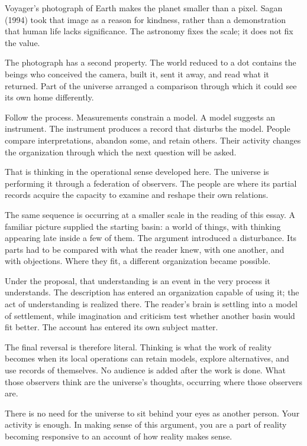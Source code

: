 \documentclass[
  11pt,
]{article}
\begin{document}
Voyager's photograph of Earth makes the planet smaller than a pixel.
Sagan (1994) took that image as a reason for kindness, rather than a
demonstration that human life lacks significance. The astronomy fixes
the scale; it does not fix the value.

The photograph has a second property. The world reduced to a dot
contains the beings who conceived the camera, built it, sent it away,
and read what it returned. Part of the universe arranged a comparison
through which it could see its own home differently.

Follow the process. Measurements constrain a model. A model suggests an
instrument. The instrument produces a record that disturbs the model.
People compare interpretations, abandon some, and retain others. Their
activity changes the organization through which the next question will
be asked.

That is thinking in the operational sense developed here. The universe
is performing it through a federation of observers. The people are where
its partial records acquire the capacity to examine and reshape their
own relations.

The same sequence is occurring at a smaller scale in the reading of this
essay. A familiar picture supplied the starting basin: a world of
things, with thinking appearing late inside a few of them. The argument
introduced a disturbance. Its parts had to be compared with what the
reader knew, with one another, and with objections. Where they fit, a
different organization became possible.

Under the proposal, that understanding is an event in the very process
it understands. The description has entered an organization capable of
using it; the act of understanding is realized there. The reader's brain
is settling into a model of settlement, while imagination and criticism
test whether another basin would fit better. The account has entered its
own subject matter.

The final reversal is therefore literal. Thinking is what the work of
reality becomes when its local operations can retain models, explore
alternatives, and use records of themselves. No audience is added after
the work is done. What those observers think are the universe's
thoughts, occurring where those observers are.

There is no need for the universe to sit behind your eyes as another
person. Your activity is enough. In making sense of this argument, you
are a part of reality becoming responsive to an account of how reality
makes sense.
\end{document}
